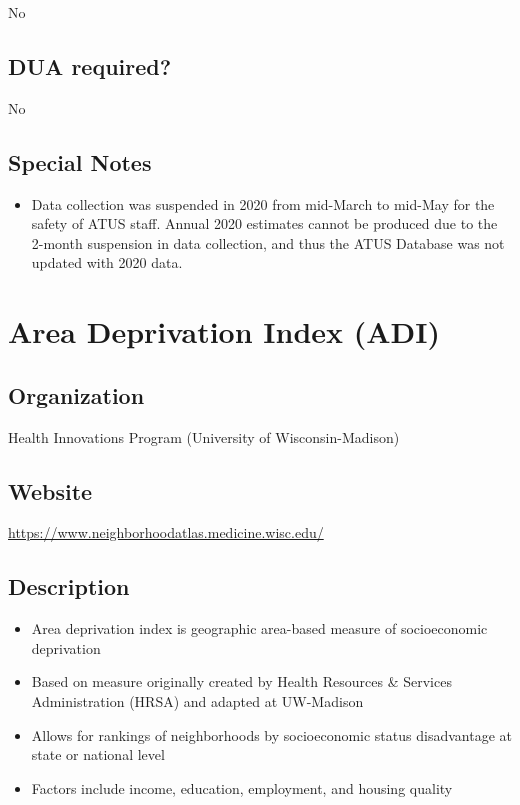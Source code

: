 \documentclass[
]{book}
\providecommand{\tightlist}{%
  \setlength{\itemsep}{0pt}\setlength{\parskip}{0pt}}
\begin{document}
No

\hypertarget{dua-required-8}{%
\section{DUA required?}\label{dua-required-8}}

No

\hypertarget{special-notes-8}{%
\section{Special Notes}\label{special-notes-8}}

\begin{itemize}
\tightlist
\item
  Data collection was suspended in 2020 from mid-March to mid-May for the safety of ATUS staff. Annual 2020 estimates cannot be produced due to the 2-month suspension in data collection, and thus the ATUS Database was not updated with 2020 data.
\end{itemize}

\mainmatter

\hypertarget{area-deprivation-index-adi}{%
\chapter{Area Deprivation Index (ADI)}\label{area-deprivation-index-adi}}

\hypertarget{organization-9}{%
\section{Organization}\label{organization-9}}

Health Innovations Program (University of Wisconsin-Madison)

\hypertarget{website-9}{%
\section{Website}\label{website-9}}

\url{https://www.neighborhoodatlas.medicine.wisc.edu/}

\hypertarget{description-9}{%
\section{Description}\label{description-9}}

\begin{itemize}
\tightlist
\item
  Area deprivation index is geographic area-based measure of socioeconomic deprivation
\item
  Based on measure originally created by Health Resources \& Services Administration (HRSA) and adapted at UW-Madison
\item
  Allows for rankings of neighborhoods by socioeconomic status disadvantage at state or national level
\item
  Factors include income, education, employment, and housing quality
\end{itemize}
\end{document}
